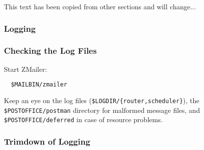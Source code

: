 This text has been copied from other sections and will change...



\subsubsection{Logging}


\subsubsection{Checking the Log Files}

Start ZMailer:
\begin{verbatim}
  $MAILBIN/zmailer
\end{verbatim}


Keep an eye on the log files ({\tt \$LOGDIR/\{router,scheduler\}}),
the {\tt \$POSTOFFICE/postman} directory for malformed message files,
and {\tt \$POSTOFFICE/deferred} in case of resource problems.


\subsubsection{Trimdown of Logging}

